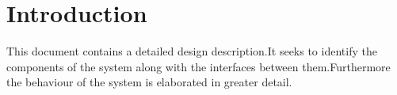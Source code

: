 \chapter{Introduction}
This document contains a detailed design description.It seeks to identify the components of the system along with the interfaces between them.Furthermore the behaviour of the system is elaborated in greater detail.
